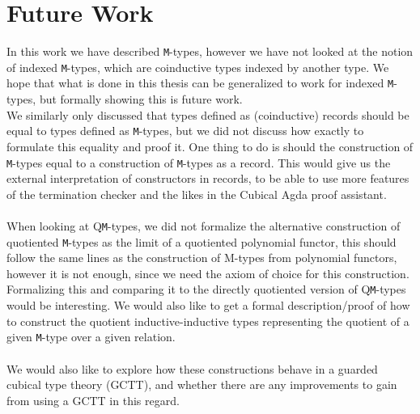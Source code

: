 \documentclass[twoside,11pt,openright]{report}
\theoremstyle{plain} %
\theoremstyle{definition}
\theoremstyle{remark}
\begin{document}
\section{Future Work}
In this work we have described \texttt{M}-types, however we have not looked at the notion of indexed \texttt{M}-types, which are coinductive types indexed by another type.  We hope that what is done in this thesis can be generalized to work for indexed \texttt{M}-types, but formally showing this is future work.
\\
We similarly only discussed that types defined as (coinductive) records should be equal to types defined as \texttt{M}-types, but we did not discuss how exactly to formulate this equality and proof it. One thing to do is should the construction of \texttt{M}-types equal to a construction of \texttt{M}-types as a record. This would give us the external interpretation of constructors in records, to be able to use more features of the termination checker and the likes in the Cubical Agda proof assistant.
\\ \\
When looking at Q\texttt{M}-types, we did not formalize the alternative construction of quotiented \texttt{M}-types as the limit of a quotiented polynomial functor, this should follow the same lines as the construction of M-types from polynomial functors, however it is not enough, since we need the axiom of choice for this construction. Formalizing this and comparing it to the directly quotiented version of Q\texttt{M}-types would be interesting. We would also like to get a formal description/proof of how to construct the quotient inductive-inductive types representing the quotient of a given \texttt{M}-type over a given relation.
\\ \\
We would also like to explore how these constructions behave in a guarded cubical type theory (GCTT), and whether there are any improvements to gain from using a GCTT in this regard.
\end{document}
